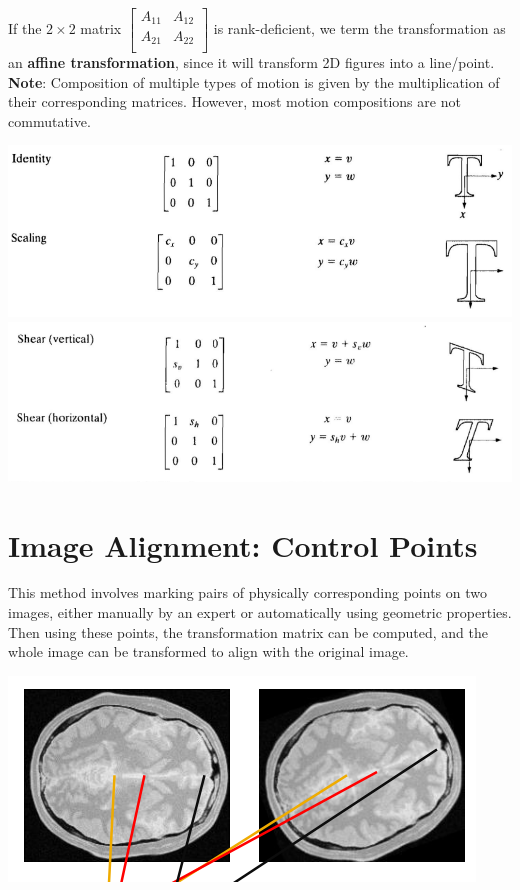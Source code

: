 \documentclass{report}
\begin{document}
\noindent If the $2\times 2$ matrix $\begin{bmatrix}
    A_{11} & A_{12} \\
    A_{21} & A_{22} \\
  \end{bmatrix}$ is rank-deficient, we term the transformation as an \textbf{affine transformation}, since it will transform 2D figures into a line/point. \\

\noindent \textbf{Note}: Composition of multiple types of motion is given by the multiplication of their corresponding matrices. However, most motion compositions are not commutative.

\begin{center}
  \includegraphics[scale=0.8]{"images/dip-02.png"}
  \includegraphics[scale=0.9]{"images/dip-03.png"}
\end{center}

\section{Image Alignment: Control Points}

\noindent This method involves marking pairs of physically corresponding points on two images, either manually by an expert or automatically using geometric properties. Then using these points, the transformation matrix can be computed, and the whole image can be transformed to align with the original image.

\begin{center}
  \includegraphics[scale=1]{"images/dip-04.png"}
\end{center}
\end{document}
